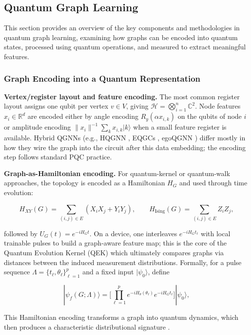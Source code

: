 \documentclass[11pt]{article}
\begin{document}
\subsection{Quantum Graph Learning}

This section provides an overview of the key components and methodologies in quantum graph learning, examining how graphs can be encoded into quantum states, processed using quantum operations, and measured to extract meaningful features. 

\subsubsection{Graph Encoding into a Quantum Representation}

\textbf{Vertex/register layout and feature encoding.}
The most common register layout assigns one qubit per vertex $v\in V$, giving $\mathcal{H}=\bigotimes_{i=1}^{n}\mathbb{C}^2$. Node features $x_i\in\mathbb{R}^d$ are encoded either by angle encoding $R_y(\alpha x_{i,k})$ on the qubits of node $i$ or amplitude encoding $\big\|x_i\big\|^{-1}\sum_{k}x_{i,k}|k\rangle$ when a small feature register is available. Hybrid QGNNs (e.g., HQGNN \cite{tuysuz2021hybrid}, EQGCs \cite{mernyei2021eqgc}, egoQGNN \cite{ai2022towards}) differ mostly in how they wire the graph into the circuit after this data embedding; the encoding step follows standard PQC practice.


\noindent \textbf{Graph-as-Hamiltonian encoding.} For quantum-kernel \cite{} or quantum-walk approaches, the topology is encoded as a Hamiltonian $H_G$ and used through time evolution:

$$
H_{XY}(G)=\sum_{(i,j)\in E}\!(X_iX_j+Y_iY_j),\qquad
H_{\mathrm{Ising}}(G)=\sum_{(i,j)\in E}\!Z_iZ_j,
$$

followed by $U_G(t)=e^{-i H_G t}$. On a device, one interleaves $e^{-iH_G t_\ell}$ with local trainable pulses to build a graph-aware feature map; this is the core of the Quantum Evolution Kernel (QEK) \cite{henry2021quantum} which ultimately compares graphs via distances between the induced measurement distributions. Formally, for a pulse sequence $\Lambda=\{t_\ell,\theta_\ell\}_{\ell=1}^p$ and a fixed input $|\psi_0\rangle$, define

$$
|\psi_f(G;\Lambda)\rangle=\Big[\prod_{\ell=1}^{p} e^{-iH_\theta(\theta_\ell)}e^{-iH_G t_\ell}\Big]|\psi_0\rangle,
$$

This Hamiltonian encoding transforms a graph into quantum dynamics, which then produces a characteristic distributional signature \citep{schuld2019feature,havlivcek2019qkernels}.
\end{document}
